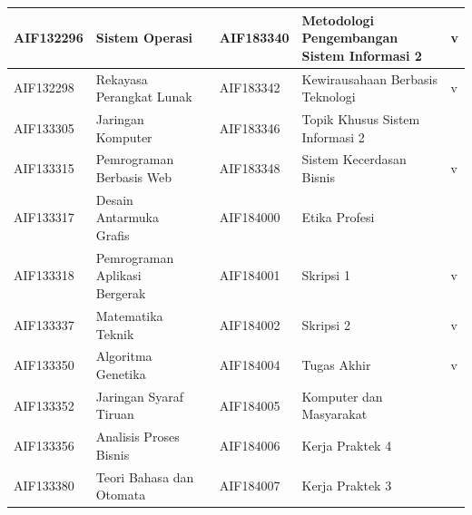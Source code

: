 \begin{enumerate}
\begin{table}[H]
\begin{tabular}{|p{2cm}|p{3.5cm}|p{1.75cm}|p{2cm}|p{3.5cm}|p{1.75cm}|}
AIF132296 & Sistem Operasi &  & AIF183340 & Metodologi Pengembangan Sistem Informasi 2 & v \\ \hline
AIF132298 & Rekayasa Perangkat Lunak &  & AIF183342 & Kewirausahaan Berbasis Teknologi & v \\ \hline
AIF133305 & Jaringan Komputer & & AIF183346 & Topik Khusus Sistem Informasi 2 & \\ \hline
AIF133315 & Pemrograman Berbasis Web &  & AIF183348 & Sistem Kecerdasan Bisnis & v \\ \hline
AIF133317 & Desain Antarmuka Grafis & & AIF184000 & Etika Profesi & \\ \hline
AIF133318 & Pemrograman Aplikasi Bergerak &  & AIF184001 & Skripsi 1 & v \\ \hline
AIF133337 & Matematika Teknik &  & AIF184002 & Skripsi 2 & v \\ \hline
AIF133350 & Algoritma Genetika &  & AIF184004 & Tugas Akhir & v \\ \hline
AIF133352 & Jaringan Syaraf Tiruan & & AIF184005 & Komputer dan Masyarakat & \\ \hline
AIF133356 & Analisis Proses Bisnis & & AIF184006 & Kerja Praktek 4 & \\ \hline
AIF133380 & Teori Bahasa dan Otomata & & AIF184007 & Kerja Praktek 3 & \\ \hline
\end{tabular}
\end{table}


\end{enumerate}

